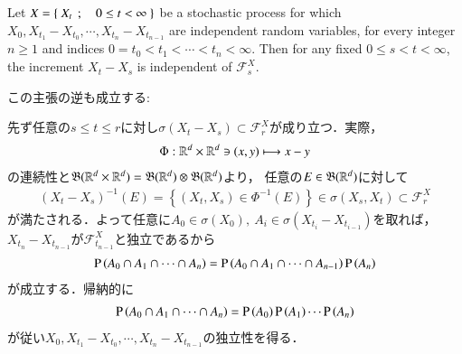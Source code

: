 \begin{screen}
	\begin{thm}\label{thm:application_dynkin_system_theorem_to_independence}
		Let $X = \left\{\ X_t\ \, ; \quad 0 \leq t < \infty\ \right\}$ be a stochastic process 
		for which $X_0,X_{t_1} - X_{t_0}, \cdots, X_{t_n} - X_{t_{n-1}}$ are 
		independent random variables, for every integer $n \geq 1$ and indices 
		$0 = t_0 < t_1 < \cdots < t_n < \infty$. Then for any fixed $0 \leq s < t < \infty$, 
		the increment $X_t - X_s$ is independent of $\mathscr{F}^X_s$.
	\end{thm}
\end{screen}
この主張の逆も成立する:
\begin{prf}
	先ず任意の$s \leq t \leq r$に対し$\sigma(X_t - X_s) \subset \mathscr{F}^X_r$が成り立つ．実際，
	\begin{align}
		\Phi:\mathbb{R}^d \times \mathbb{R}^d \ni (x,y) \longmapsto x - y
	\end{align}
	の連続性と$\mathfrak{B}(\mathbb{R}^d \times \mathbb{R}^d) = \mathfrak{B}(\mathbb{R}^d) \otimes \mathfrak{B}(\mathbb{R}^d)$より，
	任意の$E \in \mathfrak{B}(\mathbb{R}^d)$に対して
	\begin{align}
		(X_t - X_s)^{-1}(E) 
		= \left\{ \left( X_t,X_s \right) \in \Phi^{-1}(E) \right\}
		\in \sigma(X_s,X_t) \subset \mathscr{F}^X_r
		\label{eq:thm_application_dynkin_system_theorem_to_independence_1}
	\end{align}
	が満たされる．よって任意に$A_0 \in \sigma(X_0),\ A_i \in \sigma(X_{t_i} - X_{t_{i-1}})$を取れば，
	$X_{t_n} - X_{t_{n-1}}$が$\mathscr{F}^X_{t_{n-1}}$と独立であるから
	\begin{align}
		\operatorname{P} \left(A_0 \cap A_1 \cap \cdots \cap A_n\right)
		= \operatorname{P} \left(A_0 \cap A_1 \cap \cdots \cap A_{n-1}\right) \operatorname{P} \left(A_n\right)
	\end{align}
	が成立する．帰納的に
	\begin{align}
		\operatorname{P} \left(A_0 \cap A_1 \cap \cdots \cap A_n\right)
		= \operatorname{P} \left(A_0\right) \operatorname{P} \left(A_1\right) \cdots \operatorname{P} \left(A_n\right)
	\end{align}
	が従い$X_0,X_{t_1} - X_{t_0}, \cdots, X_{t_n} - X_{t_{n-1}}$の独立性を得る．
	\QED
\end{prf}

